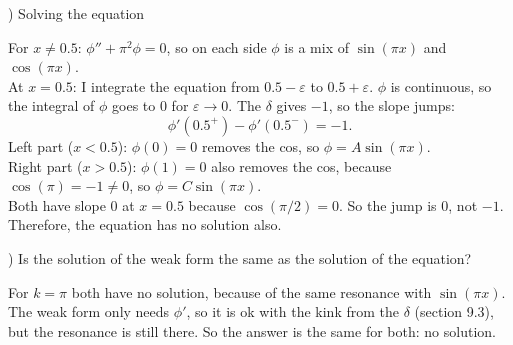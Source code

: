 \documentclass[11pt]{article}
\begin{document}
\medskip
{}) Solving the equation
\nopagebreak

\noindent For $x \neq 0.5$: $\phi'' + \pi^2\phi = 0$, so on each side $\phi$ is a mix of $\sin(\pi x)$ and $\cos(\pi x)$.\\
At $x = 0.5$: I integrate the equation from $0.5 - \varepsilon$ to $0.5 + \varepsilon$. $\phi$ is continuous, so the integral of $\phi$ goes to 0 for $\varepsilon \to 0$. The $\delta$ gives $-1$, so the slope jumps:
\[
\phi'(0.5^+) - \phi'(0.5^-) = -1.
\]
Left part ($x < 0.5$): $\phi(0) = 0$ removes the cos, so $\phi = A\sin(\pi x)$.\\
Right part ($x > 0.5$): $\phi(1) = 0$ also removes the cos, because $\cos(\pi) = -1 \neq 0$, so $\phi = C\sin(\pi x)$.\\
Both have slope 0 at $x = 0.5$ because $\cos(\pi/2) = 0$. So the jump is 0, not $-1$. Therefore, the equation has no solution also.

\medskip
{}) Is the solution of the weak form the same as the solution of the equation?
\nopagebreak

\noindent For $k = \pi$ both have no solution, because of the same resonance with $\sin(\pi x)$.
The weak form only needs $\phi'$, so it is ok with the kink from the $\delta$ (section 9.3), but the resonance is still there.
So the answer is the same for both: no solution.
\end{document}
